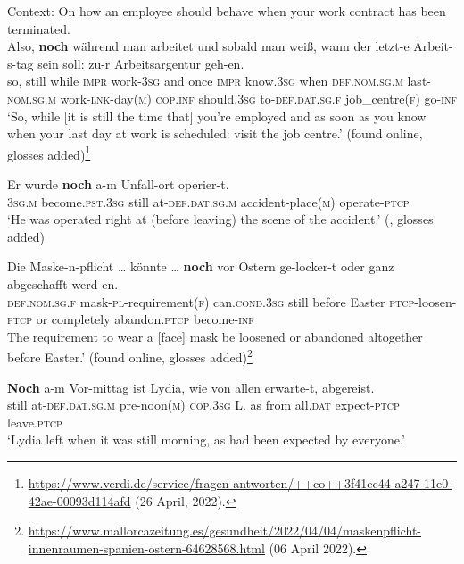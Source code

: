 \begin{exe}
\ex\label{appendixGermanContinuativeTT3}
	Context: On how an employee should behave when your work contract has been terminated.\\
	\gll Also, \textbf{noch} während man arbeitet und sobald man weiß, wann der letzt-e Arbeit-s-tag sein soll: zu-r Arbeitsargentur geh-en.\\
	so, still while \textsc{impr} work-3\textsc{sg} and once \textsc{impr} know.3\textsc{sg} when \textsc{def}.\textsc{nom}.\textsc{sg}.\textsc{m} last-\textsc{nom}.\textsc{sg}.\textsc{m} work-\textsc{lnk}-day(\textsc{m}) \textsc{cop}.\textsc{inf} should.3\textsc{sg} to-\textsc{def}.\textsc{dat}.\textsc{sg}.\textsc{f} job\_centre(\textsc{f}) go-\textsc{inf}\\
	\glt \lq So, while [it is still the time that] you're employed and as soon as you know when your last day at work is scheduled: visit the job centre.\rq{ }(found online, glosses added)\footnote{\url{https://www.verdi.de/service/fragen-antworten/++co++3f41ec44-a247-11e0-42ae-00093d114afd} (26 April, 2022).}

\ex\label{exAppendixGermanContinuativeTimeFrame4}
\gll Er wurde \textbf{noch} a-m Unfall-ort operier-t.\\
3\textsc{sg}.\textsc{m} become.\textsc{pst}.3\textsc{sg} still at-\textsc{def}.\textsc{dat}.\textsc{sg}.\textsc{m} accident-place(\textsc{m}) operate-\textsc{ptcp}\\
\glt \lq He was operated right at (before leaving) the scene of the accident.'  (\cite[s.v. \textit{noch}]{Duden}, glosses added)

\ex\label{exAppendixGermanContinuativeTimeFrame5}
\gll Die Maske-n-pflicht  … könnte … \textbf{noch} vor Ostern ge-locker-t oder ganz abgeschafft werd-en.\\
\textsc{def}.\textsc{nom}.\textsc{sg}.\textsc{f} mask-\textsc{pl}-requirement(\textsc{f}) {} can.\textsc{cond}.3\textsc{sg} {} still before Easter \textsc{ptcp}-loosen-\textsc{ptcp} or completely abandon.\textsc{ptcp} become-\textsc{inf}\\
\glt The requirement to wear a [face] mask be loosened or abandoned altogether before Easter.' (found online, glosses added)\footnote{\url{https://www.mallorcazeitung.es/gesundheit/2022/04/04/maskenpflicht-innenraumen-spanien-ostern-64628568.html} (06 April 2022).}

\ex\label{exAppendixGermanContinuativeTimeFrame6}
\gll \textbf{Noch} a-m Vor-mittag ist Lydia, wie von allen erwarte-t, abgereist.\\
still at-\textsc{def}.\textsc{dat}.\textsc{sg}.\textsc{m} pre-noon(\textsc{m}) \textsc{cop}.3\textsc{sg} L. as from all.\textsc{dat} expect-\textsc{ptcp} leave.\textsc{ptcp}\\
\glt \lq Lydia left when it was still morning, as had been expected by everyone.' \parencite[27 fn10]{Beck2020}
\end{exe}

